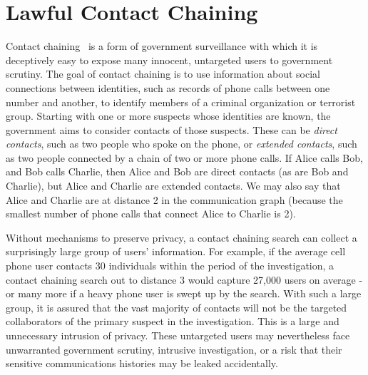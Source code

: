 \section{Lawful Contact Chaining}\label{sec-chaining}
Contact chaining~\cite{techdirt} is a form of government surveillance with which it is deceptively easy to expose many innocent, untargeted users to government scrutiny. The goal of contact chaining is to use information about social connections between identities, such as records of phone calls between one number and another, to identify members of a criminal organization or terrorist group. Starting with one or more suspects whose identities are known, the government aims to consider contacts of those suspects. These can be \emph{direct contacts}, such as two people who spoke on the phone, or \emph{extended contacts}, such as two people connected by a chain of two or more phone calls. If Alice calls Bob, and Bob calls Charlie, then Alice and Bob are direct contacts (as are Bob and Charlie), but Alice and Charlie are extended contacts. We may also say that Alice and Charlie are at distance 2 in the communication graph (because the smallest number of phone calls that connect Alice to Charlie is 2).



Without mechanisms to preserve privacy, a contact chaining search can collect a surprisingly large group of users' information. For example, if the average cell phone user contacts 30 individuals within the period of the investigation, a contact chaining search out to distance 3 would capture 27,000 users on average - or many more if a heavy phone user is swept up by the search. With such a large group, it is assured that the vast majority of contacts will not be the targeted collaborators of the primary suspect in the investigation. This is a large and unnecessary intrusion of privacy. These untargeted users may nevertheless face unwarranted government scrutiny, intrusive investigation, or a risk that their sensitive communications histories may be leaked accidentally.



